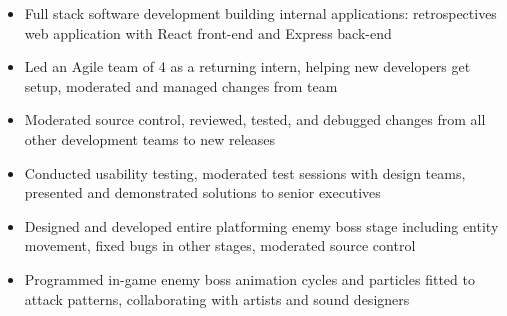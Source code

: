 \documentclass[10pt,a4paper,ragged2e,withhyper]{altacv}
\begin{document}
\begin{paracol}{2}
\divider

\begin{itemize}
    \item Full stack software development building internal applications: retrospectives web application with React front-end and Express back-end
    
    \item Led an Agile team of 4 as a returning intern, helping new developers get setup, moderated and managed changes from team
    
    \item Moderated source control, reviewed, tested, and debugged changes from all other development teams to new releases
    
    \item Conducted usability testing, moderated test sessions with design teams, presented and demonstrated solutions to senior executives
\end{itemize}

\divider




\begin{itemize}
\item Designed and developed entire platforming enemy boss stage including entity movement, fixed bugs in other stages, moderated source control

\item Programmed in-game enemy boss animation cycles and particles fitted to attack patterns, collaborating with artists and sound designers

\end{itemize}


\end{paracol}
\end{document}
